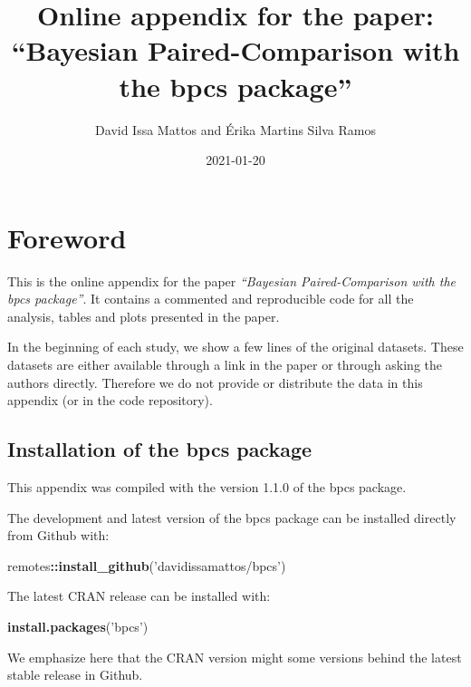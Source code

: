 \documentclass[
]{book}
\title{Online appendix for the paper: ``Bayesian Paired-Comparison with the bpcs package''}
\author{David Issa Mattos and Érika Martins Silva Ramos}
\date{2021-01-20}
\newenvironment{Shaded}{\begin{snugshade}}{\end{snugshade}}
\newcommand{\KeywordTok}[1]{\textcolor[rgb]{0.13,0.29,0.53}{\textbf{#1}}}
\newcommand{\NormalTok}[1]{#1}
\newcommand{\OperatorTok}[1]{\textcolor[rgb]{0.81,0.36,0.00}{\textbf{#1}}}
\newcommand{\StringTok}[1]{\textcolor[rgb]{0.31,0.60,0.02}{#1}}
\begin{document}
\maketitle

{
\setcounter{tocdepth}{1}
\tableofcontents
}
\hypertarget{foreword}{%
\chapter{Foreword}\label{foreword}}

This is the online appendix for the paper \emph{``Bayesian Paired-Comparison with the bpcs package''}. It contains a commented and reproducible code for all the analysis, tables and plots presented in the paper.

In the beginning of each study, we show a few lines of the original datasets. These datasets are either available through a link in the paper or through asking the authors directly. Therefore we do not provide or distribute the data in this appendix (or in the code repository).

\hypertarget{installation-of-the-bpcs-package}{%
\section{Installation of the bpcs package}\label{installation-of-the-bpcs-package}}

This appendix was compiled with the version 1.1.0 of the bpcs package.

The development and latest version of the bpcs package can be installed directly from Github with:

\begin{Shaded}
\begin{Highlighting}[]
\NormalTok{remotes}\OperatorTok{::}\KeywordTok{install_github}\NormalTok{(}\StringTok{'davidissamattos/bpcs'}\NormalTok{)}
\end{Highlighting}
\end{Shaded}

The latest CRAN release can be installed with:

\begin{Shaded}
\begin{Highlighting}[]
\KeywordTok{install.packages}\NormalTok{(}\StringTok{'bpcs'}\NormalTok{)}
\end{Highlighting}
\end{Shaded}

We emphasize here that the CRAN version might some versions behind the latest stable release in Github.
\end{document}
